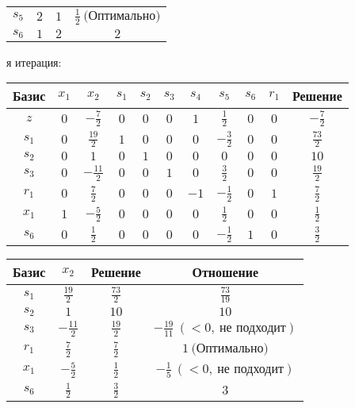 \documentclass{article}%
\begin{document}
\begin{flushleft}
\begin{tabular}{|cccc|}
$s_{5}$&$2$&$1$&$\frac{1}{2}\: \text{(Оптимально)}$\\%
$s_{6}$&$1$&$2$&$2$\\%
\hline%
\end{tabular}%
\newline%
\newline%
я итерация: %
\newline%
\newline%
\renewcommand{\arraystretch}{1.3}%
\begin{tabular}{|c|ccccccccc|c|}%
\hline%
Базис&$x_{1}$&$x_{2}$&$s_{1}$&$s_{2}$&$s_{3}$&$s_{4}$&$s_{5}$&$s_{6}$&$r_{1}$&Решение\\%
\hline%
$z$&$0$&$-\frac{7}{2}$&$0$&$0$&$0$&$1$&$\frac{1}{2}$&$0$&$0$&$-\frac{7}{2}$\\%
\hline%
$s_{1}$&$0$&$\frac{19}{2}$&$1$&$0$&$0$&$0$&$-\frac{3}{2}$&$0$&$0$&$\frac{73}{2}$\\%
$s_{2}$&$0$&$1$&$0$&$1$&$0$&$0$&$0$&$0$&$0$&$10$\\%
$s_{3}$&$0$&$-\frac{11}{2}$&$0$&$0$&$1$&$0$&$\frac{3}{2}$&$0$&$0$&$\frac{19}{2}$\\%
$r_{1}$&$0$&$\frac{7}{2}$&$0$&$0$&$0$&$-1$&$-\frac{1}{2}$&$0$&$1$&$\frac{7}{2}$\\%
$x_{1}$&$1$&$-\frac{5}{2}$&$0$&$0$&$0$&$0$&$\frac{1}{2}$&$0$&$0$&$\frac{1}{2}$\\%
$s_{6}$&$0$&$\frac{1}{2}$&$0$&$0$&$0$&$0$&$-\frac{1}{2}$&$1$&$0$&$\frac{3}{2}$\\%
\hline%
\end{tabular}%
\newline%
\newline%
\newline%
\begin{tabular}{|cccc|}%
\hline%
Базис&$x_{2}$&Решение&Отношение\\%
\hline%
$s_{1}$&$\frac{19}{2}$&$\frac{73}{2}$&$\frac{73}{19}$\\%
$s_{2}$&$1$&$10$&$10$\\%
$s_{3}$&$-\frac{11}{2}$&$\frac{19}{2}$&$-\frac{19}{11}\: (< 0, \: \text{не подходит})$\\%
$r_{1}$&$\frac{7}{2}$&$\frac{7}{2}$&$1\: \text{(Оптимально)}$\\%
$x_{1}$&$-\frac{5}{2}$&$\frac{1}{2}$&$-\frac{1}{5}\: (< 0, \: \text{не подходит})$\\%
$s_{6}$&$\frac{1}{2}$&$\frac{3}{2}$&$3$\\%
\hline%
\end{tabular}%

\end{flushleft}
\end{document}
